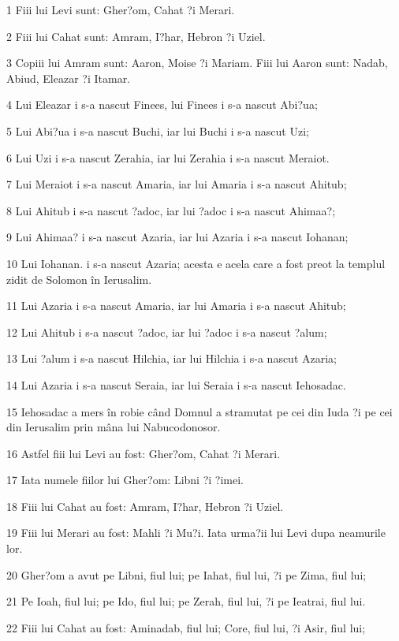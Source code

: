 \par 1 Fiii lui Levi sunt: Gher?om, Cahat ?i Merari.
\par 2 Fiii lui Cahat sunt: Amram, I?har, Hebron ?i Uziel.
\par 3 Copiii lui Amram sunt: Aaron, Moise ?i Mariam. Fiii lui Aaron sunt: Nadab, Abiud, Eleazar ?i Itamar.
\par 4 Lui Eleazar i s-a nascut Finees, lui Finees i s-a nascut Abi?ua;
\par 5 Lui Abi?ua i s-a nascut Buchi, iar lui Buchi i s-a nascut Uzi;
\par 6 Lui Uzi i s-a nascut Zerahia, iar lui Zerahia i s-a nascut Meraiot.
\par 7 Lui Meraiot i s-a nascut Amaria, iar lui Amaria i s-a nascut Ahitub;
\par 8 Lui Ahitub i s-a nascut ?adoc, iar lui ?adoc i s-a nascut Ahimaa?;
\par 9 Lui Ahimaa? i s-a nascut Azaria, iar lui Azaria i s-a nascut Iohanan;
\par 10 Lui Iohanan. i s-a nascut Azaria; acesta e acela care a fost preot la templul zidit de Solomon în Ierusalim.
\par 11 Lui Azaria i s-a nascut Amaria, iar lui Amaria i s-a nascut Ahitub;
\par 12 Lui Ahitub i s-a nascut ?adoc, iar lui ?adoc i s-a nascut ?alum;
\par 13 Lui ?alum i s-a nascut Hilchia, iar lui Hilchia i s-a nascut Azaria;
\par 14 Lui Azaria i s-a nascut Seraia, iar lui Seraia i s-a nascut Iehosadac.
\par 15 Iehosadac a mers în robie când Domnul a stramutat pe cei din Iuda ?i pe cei din Ierusalim prin mâna lui Nabucodonosor.
\par 16 Astfel fiii lui Levi au fost: Gher?om, Cahat ?i Merari.
\par 17 Iata numele fiilor lui Gher?om: Libni ?i ?imei.
\par 18 Fiii lui Cahat au fost: Amram, I?har, Hebron ?i Uziel.
\par 19 Fiii lui Merari au fost: Mahli ?i Mu?i. Iata urma?ii lui Levi dupa neamurile lor.
\par 20 Gher?om a avut pe Libni, fiul lui; pe Iahat, fiul lui, ?i pe Zima, fiul lui;
\par 21 Pe Ioah, fiul lui; pe Ido, fiul lui; pe Zerah, fiul lui, ?i pe Ieatrai, fiul lui.
\par 22 Fiii lui Cahat au fost: Aminadab, fiul lui; Core, fiul lui, ?i Asir, fiul lui;
